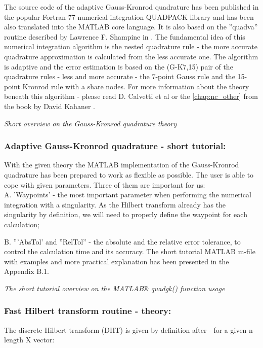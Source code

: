 \documentclass[12pt,twoside,a4paper]{article}
\numberwithin{equation}{subsection}
\numberwithin{figure}{subsection}
\begin{document}
The source code of the adaptive Gauss-Kronrod quadrature has been published in the popular Fortran 77 numerical integration
QUADPACK library and has been also translated into the MATLAB core language. It is also based on the ''quadva'' routine described by
Lawrence F. Shampine in \cite{shampine_vectorized}. The fundamental idea of this numerical integration algorithm is the nested
quadrature rule - the more accurate quadrature approximation is calculated from the less accurate one. The algorithm is adaptive
and the error estimation is based on the (G-K7,15) pair of the quadrature rules - less and more accurate - the 7-point Gauss rule
and the 15-point Kronrod rule with a share nodes. For more information about the theory beneath this algorithm - please read D.
Calvetti et al \cite{calvetti_computation} or the \ref{chap:nc_other} from the book by David Kahaner \cite{kahaner_numerical}.

\textit{Short overview on the Gauss-Kronrod quadrature theory}

\subsubsection*{Adaptive Gauss-Kronrod quadrature - short tutorial:}

With the given theory the MATLAB implementation of the Gauss-Kronrod quadrature has been prepared to work as flexible as possible.
The user is able to cope with given parameters. Three of them are important for us: \\
A. 'Waypoints' - the most important parameter when performing the numerical integration with a singularity. As the Hilbert
transform already has the singularity by definition, we will need to properly define the waypoint for each calculation;

B. '''AbsTol' and ''RelTol'' - the absolute and the relative error tolerance, to control the calculation time and its accuracy. The
short tutorial MATLAB m-file with examples and more practical explanation has been presented in the Appendix B.1.

\textit{The short tutorial overview on the MATLAB® quadgk() function usage}

\subsubsection*{Fast Hilbert transform routine - theory:}

The discrete Hilbert transform (DHT) is given by definition after \cite{kak_multilayeredarray} - for a given n-length X vector:
\end{document}
